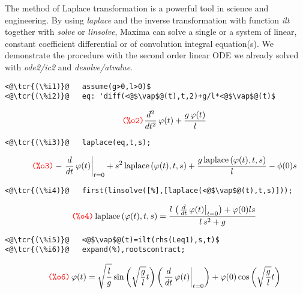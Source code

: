 \documentclass[../Maxima_Workbook.tex]{subfiles}
\begin{document}
The method of Laplace transformation is a powerful tool in science and engineering. By using \emph{laplace} and the inverse transformation with function \emph{ilt} together with \emph{solve} or \emph{linsolve}, Maxima can solve a single or a system of linear, constant coefficient differential or of convolution integral equation(s). We demonstrate the procedure with the second order linear ODE we already solved with \emph{ode2/ic2} and \emph{desolve/atvalue}.

\lz \begin{small}
\color{blue} \leqn
\begin{lstlisting}
<@\tcr{(\%i1)}@   assume(g>0,l>0)$
<@\tcr{(\%i2)}@   eq: 'diff(<@$\vap$@(t),t,2)+g/l*<@$\vap$@(t)$	   \end{lstlisting}
\vspace{-4mm} \[\tag*{\tcr{\ttfamily (\%o2)}} \frac{{{d}^{2}}}{d {{t}^{2}}} \operatorname{\vap }(t)+\frac{g \operatorname{\vap }(t)}{l} \]
\vspace{-5mm} \begin{lstlisting}    
<@\tcr{(\%i3)}@   laplace(eq,t,s);	        
\end{lstlisting}
\vspace{-4mm} \[\tag*{\tcr{\ttfamily (\%o3)}} -\left. \frac{d}{d t} \operatorname{\vap }(t)\right|_{t=0}+{{s}^{2}} \operatorname{laplace}\left( \operatorname{\vap }(t),t,s\right) +\frac{g \operatorname{laplace}\left( \operatorname{\vap }(t),t,s\right) }{l}-\operatorname{\phi }(0) s \]
\vspace{-5mm} \begin{lstlisting}
<@\tcr{(\%i4)}@   first(linsolve([%],[laplace(<@$\vap$@(t),t,s)]));
\end{lstlisting}
\vspace{-4mm} \[\tag*{\tcr{\ttfamily (\%o4)}} \operatorname{laplace}\left( \operatorname{\vap }(t),t,s\right) =\frac{l\, \left( \left. \frac{d}{d t} \operatorname{\vap }(t)\right|_{t=0}\right) +\operatorname{\vap }(0) l s}{l\, {{s}^{2}}+g} \]
\vspace{-5mm} \begin{lstlisting}
<@\tcr{(\%i5)}@   <@$\vap$@(t)=ilt(rhs(Leq1),s,t)$
<@\tcr{(\%i6)}@   expand(%),rootscontract;
\end{lstlisting}
\vspace{-4mm} \[\tag*{\tcr{\ttfamily (\%o6)}} \operatorname{\vap }(t)=\sqrt{\frac{l}{g}} \sin{\left( \sqrt{\frac{g}{l}} t\right) } \left( \left. \frac{d}{d t} \operatorname{\vap }(t)\right|_{t=0}\right) +\operatorname{\vap }(0) \cos{\left( \sqrt{\frac{g}{l}} t\right) } \]
\color{black} \reqn
\end{small} \vspace{-2mm}
\end{document}
